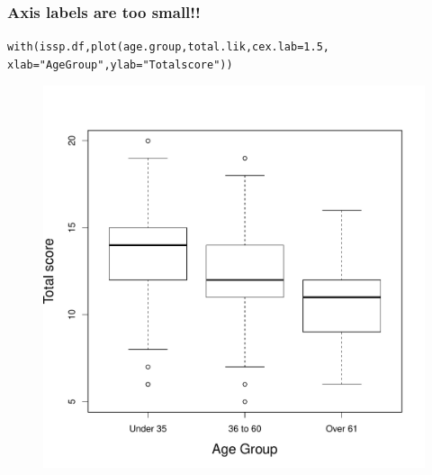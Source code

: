 \documentclass{beamer}\usepackage[]{graphicx}\usepackage[]{color}
\makeatletter
\newcommand{\hlnum}[1]{\textcolor[rgb]{0.533,0,0.133}{#1}}%
\newcommand{\hlstr}[1]{\textcolor[rgb]{0.667,0.267,0}{#1}}%
\newcommand{\hlstd}[1]{\textcolor[rgb]{0,0,0}{#1}}%
\newcommand{\hlkwc}[1]{\textcolor[rgb]{0,0,0.4}{#1}}%
\newcommand{\hlkwd}[1]{\textcolor[rgb]{0,0.267,0.4}{#1}}%
\newenvironment{kframe}{%
 \def\at@end@of@kframe{}%
 \ifinner\ifhmode%
  \def\at@end@of@kframe{\end{minipage}}%
  \begin{minipage}{\columnwidth}%
 \fi\fi%
 \def\FrameCommand##1{\hskip\@totalleftmargin \hskip-\fboxsep
 \colorbox{shadecolor}{##1}\hskip-\fboxsep
     \hskip-\linewidth \hskip-\@totalleftmargin \hskip\columnwidth}%
 \MakeFramed {\advance\hsize-\width
   \@totalleftmargin\z@ \linewidth\hsize
   \@setminipage}}%
 {\par\unskip\endMakeFramed%
 \at@end@of@kframe}
\newenvironment{knitrout}{}{} %
\makeatother
\begin{document}
\begin{frame}[fragile]
  \frametitle{Axis labels are too small!!}
\begin{knitrout}
\color{fgcolor}\begin{kframe}
\begin{alltt}
\hlkwd{with}\hlstd{(issp.df,} \hlkwd{plot}\hlstd{(age.group, total.lik,} \hlkwc{cex.lab} \hlstd{=} \hlnum{1.5}\hlstd{,}
    \hlkwc{xlab} \hlstd{=} \hlstr{"Age Group"}\hlstd{,} \hlkwc{ylab} \hlstd{=} \hlstr{"Total score"}\hlstd{))}
\end{alltt}
\end{kframe}
\end{knitrout}

\begin{figure}[h]
  \vspace{-25pt}
  \centering
  \includegraphics[height = 0.6\textwidth, keepaspectratio]{Figure/box4}
  \label{fig:box4}
\end{figure}
\end{frame}
\end{document}
